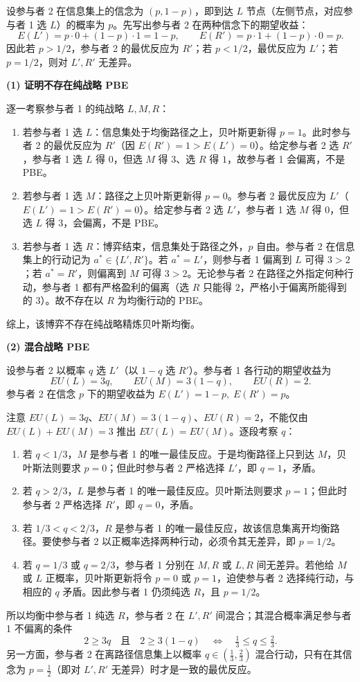 \sol 设参与者 2 在信息集上的信念为 $(p,1-p)$，即到达 $L$ 节点（左侧节点，对应参与者 1 选 $L$）的概率为 $p$。先写出参与者 2 在两种信念下的期望收益：
\[
  E(L')=p\cdot 0+(1-p)\cdot 1=1-p,\qquad
  E(R')=p\cdot 1+(1-p)\cdot 0=p .
\]\indent
因此若 $p>1/2$，参与者 2 的最优反应为 $R'$；若 $p<1/2$，最优反应为 $L'$；若 $p=1/2$，则对 $L',R'$ 无差异。

\noindent\textbf{(1) 证明不存在纯战略 PBE}

逐一考察参与者 1 的纯战略 $L,M,R$：

\begin{enumerate}[leftmargin=1.6em]
  \item 若参与者 1 选 $L$：信息集处于均衡路径之上，贝叶斯更新得 $p=1$。此时参与者 2 的最优反应为 $R'$（因 $E(R')=1>E(L')=0$）。给定参与者 2 选 $R'$，参与者 1 选 $L$ 得 $0$，但选 $M$ 得 $3$、选 $R$ 得 $1$，故参与者 1 会偏离，不是 PBE。
  \item 若参与者 1 选 $M$：路径之上贝叶斯更新得 $p=0$。参与者 2 最优反应为 $L'$（$E(L')=1>E(R')=0$）。给定参与者 2 选 $L'$，参与者 1 选 $M$ 得 $0$，但选 $L$ 得 $3$，会偏离，不是 PBE。
  \item 若参与者 1 选 $R$：博弈结束，信息集处于路径之外，$p$ 自由。参与者 2 在信息集上的行动记为 $a^*\in\{L',R'\}$。若 $a^*=L'$，则参与者 1 偏离到 $L$ 可得 $3>2$；若 $a^*=R'$，则偏离到 $M$ 可得 $3>2$。无论参与者 2 在路径之外指定何种行动，参与者 1 都有严格盈利的偏离（选 $R$ 只能得 $2$，严格小于偏离所能得到的 $3$）。故不存在以 $R$ 为均衡行动的 PBE。
\end{enumerate}
综上，该博弈不存在纯战略精炼贝叶斯均衡。

\noindent\textbf{(2) 混合战略 PBE}

设参与者 2 以概率 $q$ 选 $L'$（以 $1-q$ 选 $R'$）。参与者 1 各行动的期望收益为
\[
  EU(L)=3q,\qquad EU(M)=3(1-q),\qquad EU(R)=2 .
\]\indent
参与者 2 在信念 $p$ 下的期望收益为 $E(L')=1-p,\;E(R')=p$。

注意 $EU(L)=3q$、$EU(M)=3(1-q)$、$EU(R)=2$，不能仅由 $EU(L)+EU(M)=3$ 推出 $EU(L)=EU(M)$。逐段考察 $q$：
\begin{enumerate}[leftmargin=1.6em]
  \item 若 $q<1/3$，$M$ 是参与者 1 的唯一最佳反应。于是均衡路径上只到达 $M$，贝叶斯法则要求 $p=0$；但此时参与者 2 严格选择 $L'$，即 $q=1$，矛盾。
  \item 若 $q>2/3$，$L$ 是参与者 1 的唯一最佳反应。贝叶斯法则要求 $p=1$；但此时参与者 2 严格选择 $R'$，即 $q=0$，矛盾。
  \item 若 $1/3<q<2/3$，$R$ 是参与者 1 的唯一最佳反应，故该信息集离开均衡路径。要使参与者 2 以正概率选择两种行动，必须令其无差异，即 $p=1/2$。
  \item 若 $q=1/3$ 或 $q=2/3$，参与者 1 分别在 $M,R$ 或 $L,R$ 间无差异。若他给 $M$ 或 $L$ 正概率，贝叶斯更新将令 $p=0$ 或 $p=1$，迫使参与者 2 选择纯行动，与相应的 $q$ 矛盾。因此参与者 1 仍须纯选 $R$，且 $p=1/2$。
\end{enumerate}
所以均衡中参与者 1 纯选 $R$，参与者 2 在 $L',R'$ 间混合；其混合概率满足参与者 1 不偏离的条件
\[
  2\ge 3q\quad\text{且}\quad 2\ge 3(1-q)
  \quad\Longleftrightarrow\quad \tfrac13\le q\le\tfrac23 .
\]\indent
另一方面，参与者 2 在离路径信息集上以概率 $q\in(\tfrac13,\tfrac23)$ 混合行动，只有在其信念为 $p=\tfrac12$（即对 $L',R'$ 无差异）时才是一致的最优反应。

